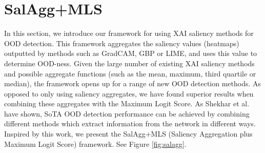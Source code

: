 \documentclass[runningheads]{llncs}
\begin{document}
\section{SalAgg+MLS} \label{section:saliencyagg_method}

In this section, we introduce our framework for using XAI saliency methods for OOD detection. This framework aggregates the saliency values (heatmaps) outputted by methods such as GradCAM, GBP or LIME, and uses this value to determine OOD-ness. Given the large number of existing XAI saliency methods and possible aggregate functions (such as the mean, maximum, third quartile or median), the framework opens up for a range of new OOD detection methods. As opposed to only using saliency aggregates, we have found superior results when combining these aggregates with the Maximum Logit Score. As Shekhar et al. \cite{combood} have shown, SoTA OOD detection performance can be achieved by combining different methods which extract information from the network in different ways. Inspired by this work, we present the SalAgg+MLS (Saliency Aggregation plus Maximum Logit Score) framework. See Figure \ref{fig:salagg}.
\end{document}
